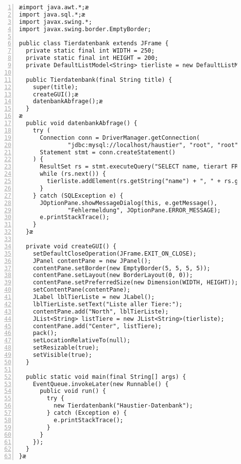 \begin{lstlisting}[numbers=left, xleftmargin=7mm]
æimport java.awt.*;æ
import java.sql.*;æ
import javax.swing.*;
import javax.swing.border.EmptyBorder;

public class Tierdatenbank extends JFrame {
  private static final int WIDTH = 250;
  private static final int HEIGHT = 200;
  private DefaultListModel<String> tierliste = new DefaultListModel<String>();

  public Tierdatenbank(final String title) {
    super(title);
    createGUI();æ
    datenbankAbfrage();æ
  }
æ  
  public void datenbankAbfrage() {
    try (
      Connection conn = DriverManager.getConnection(
              "jdbc:mysql://localhost/haustier", "root", "root");
      Statement stmt = conn.createStatement()
    ) {
      ResultSet rs = stmt.executeQuery("SELECT name, tierart FROM tier");
      while (rs.next()) {
        tierliste.addElement(rs.getString("name") + ", " + rs.getString("tierart")); 
      }
    } catch (SQLException e) {
      JOptionPane.showMessageDialog(this, e.getMessage(),
              "Fehlermeldung", JOptionPane.ERROR_MESSAGE);
      e.printStackTrace();
    }
  }æ
  
  private void createGUI() {
    setDefaultCloseOperation(JFrame.EXIT_ON_CLOSE);
    JPanel contentPane = new JPanel();
    contentPane.setBorder(new EmptyBorder(5, 5, 5, 5));
    contentPane.setLayout(new BorderLayout(0, 0));
    contentPane.setPreferredSize(new Dimension(WIDTH, HEIGHT));
    setContentPane(contentPane);
    JLabel lblTierListe = new JLabel();
    lblTierListe.setText("Liste aller Tiere:");
    contentPane.add("North", lblTierListe);
    JList<String> listTiere = new JList<String>(tierliste);
    contentPane.add("Center", listTiere);
    pack();
    setLocationRelativeTo(null);
    setResizable(true);
    setVisible(true);  
  }
  
  public static void main(final String[] args) {
    EventQueue.invokeLater(new Runnable() {
      public void run() {
        try {
          new Tierdatenbank("Haustier-Datenbank");
        } catch (Exception e) {
          e.printStackTrace();
        }
      }
    });
  }
}æ
\end{lstlisting}